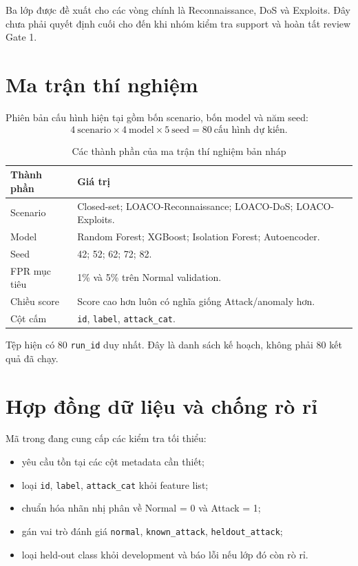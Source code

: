 \documentclass[12pt,a4paper,oneside]{report}
\begin{document}
Ba lớp được đề xuất cho các vòng chính là Reconnaissance, DoS và Exploits. Đây chưa phải quyết định cuối cho đến khi nhóm kiểm tra support và hoàn tất review Gate 1.

\section{Ma trận thí nghiệm}

Phiên bản cấu hình hiện tại gồm bốn scenario, bốn model và năm seed:
\begin{equation}
4\ \text{scenario} \times 4\ \text{model} \times 5\ \text{seed}
= 80\ \text{cấu hình dự kiến}.
\end{equation}

\begin{table}[H]
\centering
\caption{Các thành phần của ma trận thí nghiệm bản nháp}
\label{tab:matrix}
\renewcommand{\arraystretch}{1.5}
\begin{tabularx}{\textwidth}{L{3.4cm}Y}
\toprule
\textbf{Thành phần} & \textbf{Giá trị} \\
\midrule
Scenario & Closed-set; LOACO-Reconnaissance; LOACO-DoS; LOACO-Exploits. \\
Model & Random Forest; XGBoost; Isolation Forest; Autoencoder. \\
Seed & 42; 52; 62; 72; 82. \\
FPR mục tiêu & 1\% và 5\% trên Normal validation. \\
Chiều score & Score cao hơn luôn có nghĩa giống Attack/anomaly hơn. \\
Cột cấm & \texttt{id}, \texttt{label}, \texttt{attack\_cat}. \\
\bottomrule
\end{tabularx}
\end{table}

Tệp  hiện có 80 \texttt{run\_id} duy nhất. Đây là danh sách kế hoạch, không phải 80 kết quả đã chạy.

\section{Hợp đồng dữ liệu và chống rò rỉ}

Mã trong  đang cung cấp các kiểm tra tối thiểu:
\begin{itemize}[leftmargin=1.05cm,itemsep=0.15em]
  \item yêu cầu tồn tại các cột metadata cần thiết;
  \item loại \texttt{id}, \texttt{label}, \texttt{attack\_cat} khỏi feature list;
  \item chuẩn hóa nhãn nhị phân về Normal = 0 và Attack = 1;
  \item gán vai trò đánh giá \texttt{normal}, \texttt{known\_attack}, \texttt{heldout\_attack};
  \item loại held-out class khỏi development và báo lỗi nếu lớp đó còn rò rỉ.
\end{itemize}
\end{document}
